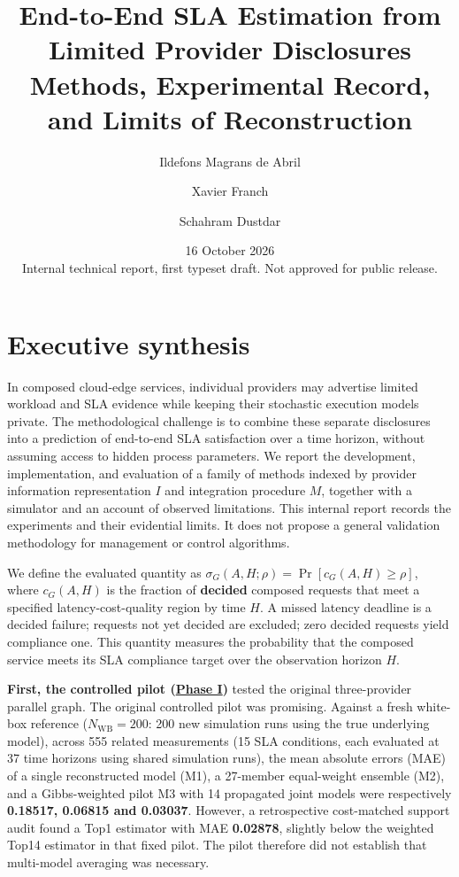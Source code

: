 \documentclass[10pt,a4paper]{article}
\title{\textbf{End-to-End SLA Estimation from Limited Provider Disclosures}\\[4pt]
{\large Methods, Experimental Record, and Limits of Reconstruction}}
\author{Ildefons Magrans de Abril \and Xavier Franch \and Schahram Dustdar}
\date{16 October 2026\\[3pt]\small Internal technical report, first typeset draft. Not approved for public release.}
\begin{document}
\maketitle
\tableofcontents
\clearpage
\section*{Executive synthesis }

In composed cloud-edge services, individual providers may advertise limited workload and SLA evidence while keeping their stochastic execution models private. The methodological challenge is to combine these separate disclosures into a prediction of end-to-end SLA satisfaction over a time horizon, without assuming access to hidden process parameters. We report the development, implementation, and evaluation of a family of methods indexed by provider information representation $I$ and integration procedure $M$, together with a simulator and an account of observed limitations. This internal report records the experiments and their evidential limits. It does not propose a general validation methodology for management or control algorithms.

We define the evaluated quantity as $\sigma_G(A,H;\rho)=\Pr[c_G(A,H)\ge\rho]$, where $c_G(A,H)$ is the fraction of \textbf{decided} composed requests that meet a specified latency-cost-quality region by time $H$. A missed latency deadline is a decided failure; requests not yet decided are excluded; zero decided requests yield compliance one. This quantity measures the probability that the composed service meets its SLA compliance target over the observation horizon $H$.

\textbf{First, the controlled pilot (\hyperref[app:experiment-stages]{Phase I})} tested the original three-provider parallel graph. The original controlled pilot was promising. Against a fresh white-box reference ($N_{\mathrm{WB}}=200$: 200 new simulation runs using the true underlying model), across 555 related measurements (15 SLA conditions, each evaluated at 37 time horizons using shared simulation runs), the mean absolute errors (MAE) of a single reconstructed model (M1), a 27-member equal-weight ensemble (M2), and a Gibbs-weighted pilot M3 with 14 propagated joint models were respectively \textbf{0.18517, 0.06815 and 0.03037}. However, a retrospective cost-matched support audit found a Top1 estimator with MAE \textbf{0.02878}, slightly below the weighted Top14 estimator in that fixed pilot. The pilot therefore did not establish that multi-model averaging was necessary.
\end{document}
